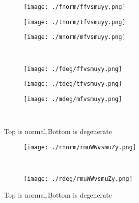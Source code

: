 \documentclass[aps,floats,floatfix,nofootinbib]{revtex4-1}
\begin{document}
\begin{center}
\begin{figure}
\begin{subfigure}{0.3\textwidth}
\texttt{[image: ./fnorm/ffvsmuyy.png]}
\label{}
\end{subfigure}
\begin{subfigure}{0.3\textwidth}
\texttt{[image: ./tnorm/tfvsmuyy.png]}
\label{}
\end{subfigure}
\begin{subfigure}{0.3\textwidth}
\texttt{[image: ./mnorm/mfvsmuyy.png]}
\label{}
\end{subfigure}\\
\begin{subfigure}{0.3\textwidth}
\texttt{[image: ./fdeg/ffvsmuyy.png]}
\label{}
\end{subfigure}
\begin{subfigure}{0.3\textwidth}
\texttt{[image: ./tdeg/tfvsmuyy.png]}
\label{}
\end{subfigure}
\begin{subfigure}{0.3\textwidth}
\texttt{[image: ./mdeg/mfvsmuyy.png]}
\label{}
\end{subfigure}\\
\caption{Top is normal,Bottom is degenerate}
\end{figure}
\end{center}

\begin{center}
\begin{figure}
\begin{subfigure}{1.0\textwidth}
\texttt{[image: ./rnorm/rmuWWvsmuZy.png]}
\label{}
\end{subfigure}\\
\begin{subfigure}{1.0\textwidth}
\texttt{[image: ./rdeg/rmuWWvsmuZy.png]}
\label{}
\end{subfigure}
\caption{Top is normal,Bottom is degenerate}
\end{figure}
\end{center}
\end{document}
